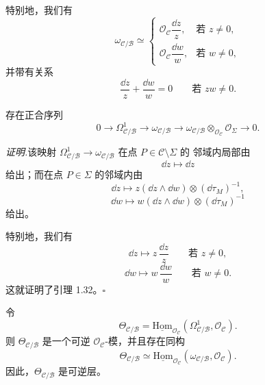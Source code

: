 
特别地，我们有
\[
\omega_{\mathcal{C}/\mathcal{B}}\simeq
\begin{cases}
\mathcal{O}_{\mathcal{C}}\dfrac{\dd z}{z}, & \text{若 } z\ne 0,\\[6pt]
\mathcal{O}_{\mathcal{C}}\dfrac{\dd w}{w}, & \text{若 } w\ne 0,
\end{cases}
\]
并带有关系
\[
\frac{\dd z}{z}+\frac{\dd w}{w}=0
\qquad\text{若 } zw\ne 0.
\]

\begin{lemma}[1.32]
存在正合序列
\[
0\to\Omega^1_{\mathcal{C}/\mathcal{B}}\to\omega_{\mathcal{C}/\mathcal{B}}
\to\omega_{\mathcal{C}/\mathcal{B}}\otimes_{\mathcal{O}_{\mathcal{C}}}
\mathcal{O}_{\Sigma}\to 0.
\]
\end{lemma}

\noindent\textit{证明.}\quad 该映射 $\Omega^1_{\mathcal{C}/\mathcal{B}}\to
\omega_{\mathcal{C}/\mathcal{B}}$ 在点 $P\in\mathcal{C}\setminus\Sigma$ 的
邻域内局部由
\[
\dd z\longmapsto\dd z
\]
给出；而在点 $P\in\Sigma$ 的邻域内由
\[
\dd z\longmapsto z(\dd z\wedge\dd w)\otimes(\dd\tau_M)^{-1},
\]
\[
\dd w\longmapsto w(\dd z\wedge\dd w)\otimes(\dd\tau_M)^{-1}
\]
给出。

特别地，我们有
\[
\dd z\longmapsto z\,\frac{\dd z}{z}\qquad\text{若 } z\ne 0,
\]
\[
\dd w\longmapsto w\,\frac{\dd w}{w}\qquad\text{若 } w\ne 0.
\]
这就证明了引理 1.32。\hfill$\square$

\begin{lemma}[1.33]
令
\begin{equation}
\Theta_{\mathcal{C}/\mathcal{B}}=
\underline{\mathrm{Hom}}_{\mathcal{O}_{\mathcal{C}}}
(\Omega^1_{\mathcal{C}/\mathcal{B}},\mathcal{O}_{\mathcal{C}}). \tag{1.59}
\end{equation}
则 $\Theta_{\mathcal{C}/\mathcal{B}}$ 是一个可逆
$\mathcal{O}_{\mathcal{C}}$-模，并且存在同构
\begin{equation}
\Theta_{\mathcal{C}/\mathcal{B}}\simeq
\underline{\mathrm{Hom}}_{\mathcal{O}_{\mathcal{C}}}
(\omega_{\mathcal{C}/\mathcal{B}},\mathcal{O}_{\mathcal{C}}). \tag{1.60}
\end{equation}
因此，$\Theta_{\mathcal{C}/\mathcal{B}}$ 是可逆层。
\end{lemma}

